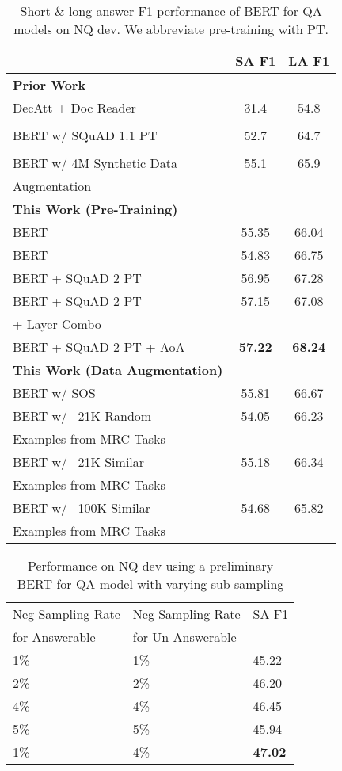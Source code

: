 \documentclass[letterpaper]{article} \usepackage{aaai20}  \usepackage{times}  \usepackage{helvet} \usepackage{courier}  \usepackage[hyphens]{url}  \usepackage{graphicx} \urlstyle{rm} \def\UrlFont{\rm}  \usepackage{graphicx}  \frenchspacing  \setlength{\pdfpagewidth}{8.5in}  \setlength{\pdfpageheight}{11in}  \usepackage{amsmath}
\newcommand{\bertbase}{BERT}
\newcommand{\best}[1]{\textbf{#1}}
\begin{document}
\begin{table}[]
\begin{center}
\begin{tabular}{lcc}
\toprule
 & SA F1 & LA F1 \\ \toprule
\textbf{Prior Work} \\ \toprule
DecAtt + Doc Reader & 31.4 & 54.8 \\
\cite{Parikh_2016} \\ \midrule
BERT w/ SQuAD 1.1 PT & 52.7 & 64.7 \\ 
 \cite{alberti2019bert} \\ \midrule
 BERT w/ 4M Synthetic Data & 55.1 & 65.9 \\
 Augmentation \cite{albert-synth-data} \\ \toprule
\textbf{This Work (Pre-Training)} \\ \toprule
BERT & 55.35 & 66.04 \\ \midrule
BERT & 54.83 & 66.75 \\ \midrule
BERT + SQuAD 2 PT & 56.95 & 67.28 \\ \midrule
BERT + SQuAD 2 PT & 57.15 & 67.08 \\
+ Layer Combo\\ \midrule
BERT + SQuAD 2 PT + AoA & \best{57.22} & \best{68.24} \\ \toprule
\textbf{This Work (Data Augmentation)} \\ \toprule
BERT w/ SOS & 55.81 & 66.67 \\ \midrule
BERT w/ ~21K Random & 54.05 & 66.23 \\
Examples from MRC Tasks \\ \midrule
BERT w/ ~21K Similar & 55.18 & 66.34 \\
Examples from MRC Tasks \\ \midrule
BERT w/ ~100K Similar & 54.68 & 65.82 \\
Examples from MRC Tasks \\ \bottomrule
\end{tabular}
\caption{Short \& long answer F1 performance of BERT-for-QA models on NQ dev. We abbreviate pre-training with PT.}
\label{tab:pretraining-dataaug}
\end{center}
\end{table}

\begin{table}[]
\centering
\begin{tabular}{lll}
\toprule
Neg Sampling Rate & Neg Sampling Rate & SA F1 \\
for Answerable &  for Un-Answerable  &  \\ \toprule
1\% & 1\% & 45.22 \\ \midrule
2\% & 2\% & 46.20 \\ \midrule
4\% & 4\% & 46.45 \\ \midrule
5\% & 5\% & 45.94 \\ \midrule
1\% & 4\% & \textbf{47.02} \\ \bottomrule
\end{tabular}
\caption{Performance on NQ dev using a preliminary \bertbase{}-for-QA model with varying sub-sampling}
\label{tab:subsampling}
\end{table}
\end{document}
